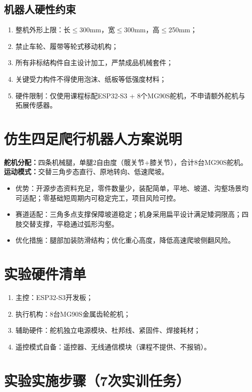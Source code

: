\documentclass[11pt,a4paper]{article}
\begin{document}
\subsection{机器人硬性约束}
\begin{enumerate}
    \item 整机外形上限：长$\le$300mm，宽$\le$300mm，高$\le$250mm；
    \item 禁止车轮、履带等轮式移动机构；
    \item 所有非标结构件自主设计加工，严禁成品机械套件；
    \item 关键受力构件不得使用泡沫、纸板等低强度材料；
    \item 硬件限制：仅使用课程标配ESP32-S3 + 8个MG90S舵机，不申请额外舵机与拓展传感器。
\end{enumerate}

\section{仿生四足爬行机器人方案说明}
\textbf{舵机分配：}四条机械腿，单腿2自由度（髋关节+膝关节），合计8台MG90S舵机。
\textbf{运动模式：}交替三角步态直行、原地转向、低速爬坡。
\begin{itemize}
    \item 优势：开源步态资料充足，零件数量少，装配简单，平地、坡道、沟壑场景均可适配；零基础短周期内可稳定完工，项目风险可控。
    \item 赛道适配：三角多点支撑保障坡道稳定；机身采用扁平设计满足矮洞限高；四肢交替支撑，平稳通过弧形沟壑。
    \item 优化措施：腿部加装防滑结构；优化重心高度，降低高速爬坡侧翻风险。
\end{itemize}

\section{实验硬件清单}
\begin{enumerate}
    \item 主控：ESP32-S3开发板；
    \item 执行机构：8台MG90S金属齿轮舵机；
    \item 辅助硬件：舵机独立电源模块、杜邦线、紧固件、焊接耗材；
    \item 遥控模式自备：遥控器、无线通信模块（课程不提供、不报销）。
\end{enumerate}

\section{实验实施步骤（7次实训任务）}
\end{document}
